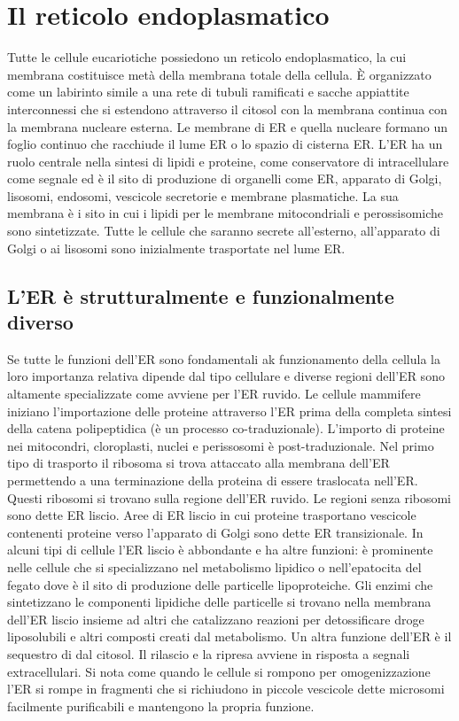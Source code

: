 \section{Il reticolo endoplasmatico}
Tutte le cellule eucariotiche possiedono un reticolo endoplasmatico, la cui membrana costituisce met\`a della membrana totale della cellula. \`E organizzato come un labirinto simile a 
una rete di tubuli ramificati e sacche appiattite interconnessi che si estendono attraverso il citosol con la membrana continua con la membrana nucleare esterna. Le membrane di ER e 
quella nucleare formano un foglio continuo che racchiude il lume ER o lo spazio di cisterna ER. L'ER ha un ruolo centrale nella sintesi di lipidi e proteine, come conservatore di
 intracellulare come segnale ed \`e il sito di produzione di organelli come ER, apparato di Golgi, lisosomi, endosomi, vescicole secretorie e membrane plasmatiche. 
La sua membrana \`e i sito in cui i lipidi per le membrane mitocondriali e perossisomiche sono sintetizzate. Tutte le cellule che saranno secrete all'esterno, all'apparato di Golgi o ai
lisosomi sono inizialmente trasportate nel lume ER.
\subsection{L'ER \`e strutturalmente e funzionalmente diverso}
Se tutte le funzioni dell'ER sono fondamentali ak funzionamento della cellula la loro importanza relativa dipende dal tipo cellulare e diverse regioni dell'ER sono altamente 
specializzate come avviene per l'ER ruvido. Le cellule mammifere iniziano l'importazione delle proteine attraverso l'ER prima della completa sintesi della catena polipeptidica (\`e un
processo co-traduzionale). L'importo di proteine nei mitocondri, cloroplasti, nuclei e perissosomi \`e post-traduzionale. Nel primo tipo di trasporto il ribosoma si trova attaccato alla
membrana dell'ER permettendo a una terminazione della proteina di essere traslocata nell'ER. Questi ribosomi si trovano sulla regione dell'ER ruvido. Le regioni senza ribosomi sono 
dette ER liscio. Aree di ER liscio in cui proteine trasportano vescicole contenenti proteine verso l'apparato di Golgi sono dette ER transizionale. In alcuni tipi di cellule l'ER liscio
\`e abbondante e ha altre funzioni: \`e prominente nelle cellule che si specializzano nel metabolismo lipidico o nell'epatocita del fegato dove \`e il sito di produzione delle 
particelle lipoproteiche. Gli enzimi che sintetizzano le componenti lipidiche delle particelle si trovano nella membrana dell'ER liscio insieme ad altri che catalizzano reazioni per
detossificare droge liposolubili e altri composti creati dal metabolismo. Un altra funzione dell'ER \`e il sequestro di  dal citosol. Il rilascio e la ripresa avviene in
risposta a segnali extracellulari. Si nota come quando le cellule si rompono per omogenizzazione l'ER si rompe in fragmenti che si richiudono in piccole vescicole dette microsomi 
facilmente purificabili e mantengono la propria funzione. 
